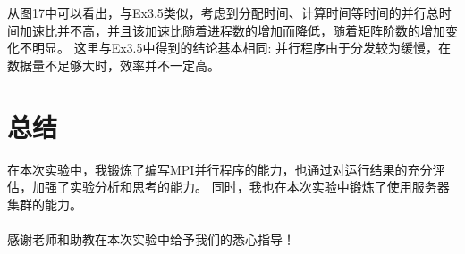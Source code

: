 \documentclass[UTF8]{article}
\begin{document}
        从图17中可以看出，与Ex3.5类似，考虑到分配时间、计算时间等时间的并行总时间加速比并不高，并且该加速比随着进程数的增加而降低，随着矩阵阶数的增加变化不明显。
        这里与Ex3.5中得到的结论基本相同: 并行程序由于分发较为缓慢，在数据量不足够大时，效率并不一定高。

\clearpage
\section{总结}
在本次实验中，我锻炼了编写MPI并行程序的能力，也通过对运行结果的充分评估，加强了实验分析和思考的能力。
同时，我也在本次实验中锻炼了使用服务器集群的能力。\\\\
感谢老师和助教在本次实验中给予我们的悉心指导！








\end{document}
